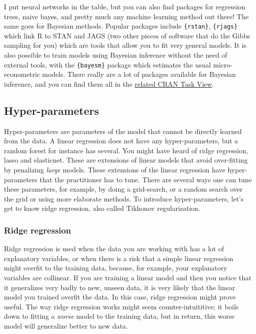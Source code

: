 \documentclass[
]{article}
\begin{document}
I put neural networks in the table, but you can also find packages for regression trees, naive
bayes, and pretty much any machine learning method out there! The same goes for Bayesian methods.
Popular packages include \texttt{\{rstan\}}, \texttt{\{rjags\}} which link R to STAN and JAGS (two other pieces of software
that do the Gibbs sampling for you) which are tools that allow you to fit very general models. It
is also possible to train models using Bayesian inference without the need of external tools,
with the \texttt{\{bayesm\}} package which estimates the usual micro-econometric models.
There really are a lot of packages available for Bayesian inference, and you can find them all in the
\href{https://cran.r-project.org/web/views/Bayesian.html}{related CRAN Task View}.

\hypertarget{hyper-parameters}{%
\subsection{Hyper-parameters}\label{hyper-parameters}}

Hyper-parameters are parameters of the model that cannot be directly learned from the data.
A linear regression does not have any hyper-parameters, but a random forest for instance has several.
You might have heard of ridge regression, lasso and elasticnet. These are
extensions of linear models that avoid over-fitting by penalizing \emph{large} models. These
extensions of the linear regression have hyper-parameters that the practitioner has to tune. There
are several ways one can tune these parameters, for example, by doing a grid-search, or a random
search over the grid or using more elaborate methods. To introduce hyper-parameters, let's get
to know ridge regression, also called Tikhonov regularization.

\hypertarget{ridge-regression}{%
\subsubsection{Ridge regression}\label{ridge-regression}}

Ridge regression is used when the data you are working with has a lot of explanatory variables,
or when there is a risk that a simple linear regression might overfit to the training data, because,
for example, your explanatory variables are collinear.
If you are training a linear model and then you notice that it generalizes very badly to new,
unseen data, it is very likely that the linear model you trained overfit the data.
In this case, ridge regression might prove useful. The way ridge regression works might seem
counter-intuititive; it boils down to fitting a \emph{worse} model to the training data, but in return,
this worse model will generalize better to new data.
\end{document}
